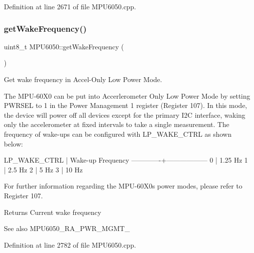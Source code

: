 Definition at line 2671 of file M\+P\+U6050.\+cpp.

\mbox{\label{classMPU6050_a249a905ae4572a462414f2d94236258a}} 
\subsubsection{\texorpdfstring{getWakeFrequency()}{getWakeFrequency()}}
{\footnotesize\ttfamily uint8\+\_\+t M\+P\+U6050\+::get\+Wake\+Frequency (\begin{DoxyParamCaption}{ }\end{DoxyParamCaption})}



Get wake frequency in Accel-\/\+Only Low Power Mode. 

The M\+P\+U-\/60\+X0 can be put into Accerlerometer Only Low Power Mode by setting P\+W\+R\+S\+EL to 1 in the Power Management 1 register (Register 107). In this mode, the device will power off all devices except for the primary I2C interface, waking only the accelerometer at fixed intervals to take a single measurement. The frequency of wake-\/ups can be configured with L\+P\+\_\+\+W\+A\+K\+E\+\_\+\+C\+T\+RL as shown below\+:


\begin{DoxyPre}
LP\_WAKE\_CTRL | Wake-up Frequency
-------------+------------------
0            | 1.25 Hz
1            | 2.5 Hz
2            | 5 Hz
3            | 10 Hz
\end{DoxyPre}


For further information regarding the M\+P\+U-\/60\+X0\textquotesingle{}s power modes, please refer to Register 107.

\begin{DoxyReturn}{Returns}
Current wake frequency 
\end{DoxyReturn}
\begin{DoxySeeAlso}{See also}
M\+P\+U6050\+\_\+\+R\+A\+\_\+\+P\+W\+R\+\_\+\+M\+G\+M\+T\+\_ 
\end{DoxySeeAlso}


Definition at line 2782 of file M\+P\+U6050.\+cpp.

\mbox{\label{classMPU6050_ada9a553176b57815f23fb7d71bb85c9d}} 

